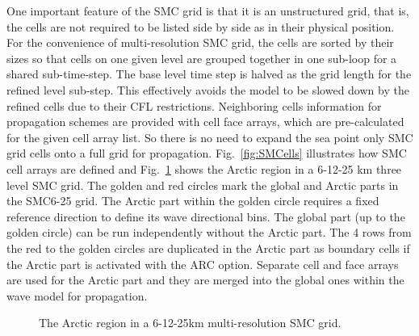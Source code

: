 One important feature of the SMC grid is that it is an unstructured grid, that
is, the cells are not required to be listed side by side as in their physical
position. For the convenience of multi-resolution SMC grid, the cells are
sorted by their sizes so that cells on one given level are grouped together in
one sub-loop for a shared sub-time-step.  The base level time step is halved
as the grid length for the refined level sub-step. This effectively avoids the
model to be slowed down by the refined cells due to their CFL restrictions. 
Neighboring cells information for propagation schemes are provided with cell 
face arrays, which are pre-calculated for the given cell array list. So there 
is no need to expand the sea point only SMC grid cells onto a full grid for 
propagation. Fig.~\ref{fig:SMCells} illustrates how SMC cell arrays are 
defined and Fig.~\ref{fig:SMC_Arctic} shows the Arctic region in a 6-12-25 km 
three level SMC grid. The golden and red circles mark the global and Arctic 
parts in the SMC6-25 grid. The Arctic part within the golden circle requires a 
fixed reference direction to define its wave directional bins. The global part 
(up to the golden circle) can be run independently without the Arctic part. 
The 4 rows from the red to the golden circles are duplicated in the Arctic part 
as boundary cells if the Arctic part is activated with the ARC option.  
Separate cell and face arrays are used for the Arctic part and they are merged 
into the global ones within the wave model for propagation.

\begin{figure}
\centerline{}
\caption{The Arctic region in a 6-12-25km multi-resolution SMC grid.}
\label{fig:SMC_Arctic} 
\botline
\end{figure}

